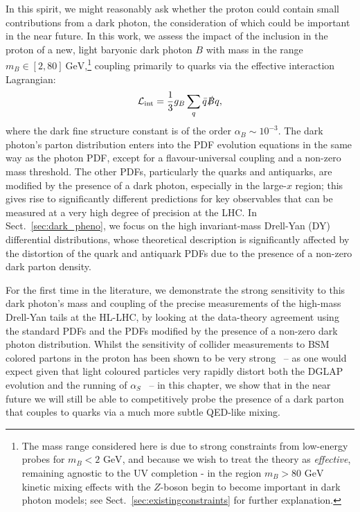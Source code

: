\documentclass[withindex,glossary]{cam-thesis}
\begin{document}
In this spirit, we might reasonably ask whether the proton could contain small contributions from a dark photon, the consideration of which
could be important in the near future. In this work, we assess the impact of the inclusion in the proton
of a new, light baryonic dark photon $B$ with mass in the 
range $m_B \in [2,80]\ \text{GeV}$,\footnote{The mass range considered here is due to strong constraints from low-energy probes for $m_B < 2\text{ GeV}$, and because we wish to treat the theory as \textit{effective}, remaining agnostic to the UV completion - in the region $m_B > 80\text{ GeV}$ kinetic mixing effects with the $Z$-boson begin to become important in dark photon models; see Sect.~\ref{sec:existingconstraints} for further explanation.} coupling primarily to quarks via
the effective interaction Lagrangian:
%
\begin{equation}
\label{eq:darkphotoninteraction}
\mathcal{L}_{\text{int}} = \frac{1}{3}g_B\sum_{q} \bar{q} \slashed{B} q,
\end{equation}
where the dark fine structure constant is of the order $\alpha_B \sim 10^{-3}$.
The dark photon's parton distribution enters into the PDF evolution equations 
in the same way as the photon PDF, except for a flavour-universal
coupling and a non-zero mass threshold. 
The other PDFs, particularly the quarks and antiquarks, are modified by the presence of a dark photon,
especially in the large-$x$ region; this gives rise to significantly
different predictions for key observables that can be measured at a
very high degree of precision at the LHC. In Sect.~\ref{sec:dark_pheno}, we focus on the
high invariant-mass Drell-Yan (DY) differential distributions, whose
theoretical description is significantly affected by the distortion of
the quark and antiquark PDFs due to the presence of a non-zero dark
parton density.

For the first time in the literature, we demonstrate the strong
sensitivity to this dark photon's mass and coupling
of the precise measurements of the high-mass Drell-Yan tails at the HL-LHC, by looking at the
data-theory agreement using the standard PDFs and the PDFs modified by the presence of a non-zero
dark photon distribution.
Whilst the sensitivity of collider measurements to BSM colored
partons in the proton has been shown to be very
strong~\cite{Berger:2004mj,Berger:2010rj} -- as one would expect given that light coloured
particles very rapidly distort both the DGLAP evolution and the
running of $\alpha_S$~\cite{Becciolini:2014lya} --
in this chapter, we show that in the near future we will still be able to competitively probe the presence of a dark parton that couples to
quarks via a much more subtle QED-like mixing.
\end{document}
